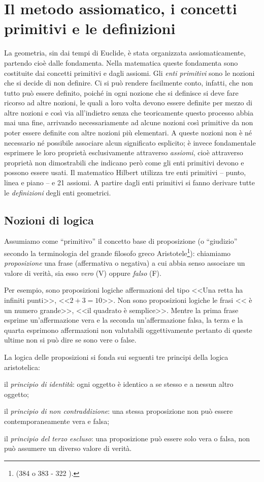 \section{Il metodo assiomatico, i concetti primitivi e le definizioni}
La geometria, sin dai tempi di Euclide, è stata organizzata assiomaticamente, partendo cioè dalle fondamenta. Nella matematica queste fondamenta sono costituite dai concetti primitivi e dagli assiomi. Gli \emph{enti primitivi} sono le nozioni che si decide di non definire. Ci si può rendere facilmente conto, infatti, che non tutto può essere definito, poiché in ogni nozione che si definisce si deve fare ricorso ad altre nozioni, le quali a loro volta devono essere definite per mezzo di altre nozioni e così via all'indietro senza che teoricamente questo processo abbia mai una fine, arrivando necessariamente ad alcune nozioni così primitive da non poter essere definite con altre nozioni più elementari. A queste nozioni non è né necessario né possibile associare alcun significato esplicito; è invece fondamentale esprimere le loro proprietà esclusivamente attraverso \emph{assiomi}, cioè attraverso proprietà non dimostrabili che indicano però come gli enti primitivi devono e possono essere usati. Il matematico Hilbert utilizza tre enti primitivi -- punto, linea e piano -- e 21 assiomi. A partire dagli enti primitivi si fanno derivare tutte le \emph{definizioni} degli enti geometrici.

\subsection{Nozioni di logica}

Assumiamo come ``primitivo'' il concetto base di proposizione (o ``giudizio'' secondo la terminologia del grande filosofo greco Aristotele\footnote{(384 o 383 \aC{} - 322 \aC).}): chiamiamo \emph{proposizione} una frase (affermativa o negativa) a cui abbia senso associare un valore di verità, sia esso \emph{vero} (V) oppure \emph{falso} (F).

Per esempio, sono proposizioni logiche affermazioni del tipo <<Una retta ha infiniti punti>>, <<$2+3=10$>>. Non sono proposizioni logiche le frasi << è un numero grande>>, <<il quadrato è semplice>>. Mentre la prima frase esprime un'affermazione vera e la seconda un'affermazione falsa, la terza e la quarta esprimono affermazioni non valutabili oggettivamente pertanto di queste ultime non si può dire se sono vere o false.

La logica delle proposizioni si fonda sui seguenti tre principi della logica aristotelica:
\begin{itemize*}
\item il \emph{principio di identità}: ogni oggetto è identico a se stesso e a nessun altro oggetto;
\item il \emph{principio di non contraddizione}: una stessa proposizione non può essere contemporaneamente vera e falsa;
\item il \emph{principio del terzo escluso}: una proposizione può essere solo vera o falsa, non può assumere un diverso valore di verità.
\end{itemize*}

